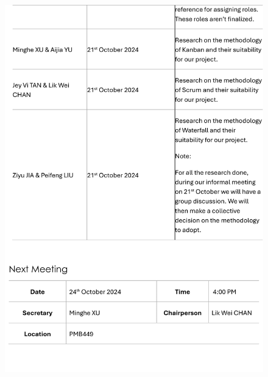 \documentclass[a4paper,12pt, oneside]{report}
\begin{document}
\begin{appendices}
\begin{figure}[H]
    \includegraphics[width=\textwidth]{Minutes/Minutes_1-cropped-4.png}
\end{figure}

\end{appendices}
\end{document}
